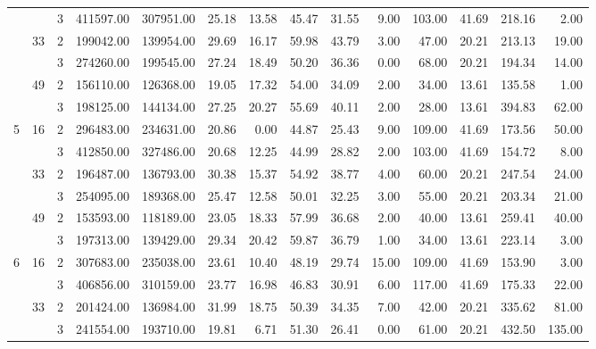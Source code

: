 \begin{tabular}{lllrrrrrrrrrrr}
  &    & 3 & 411597.00 & 307951.00 & 25.18 &   13.58 &   45.47 &   31.55 &    9.00 &  103.00 &   41.69 & 218.16 &     2.00 \\
\cline{2-14}
  & \multirow{2}{*}{33} & 2 & 199042.00 & 139954.00 & 29.69 &   16.17 &   59.98 &   43.79 &    3.00 &   47.00 &   20.21 & 213.13 &    19.00 \\
  &    & 3 & 274260.00 & 199545.00 & 27.24 &   18.49 &   50.20 &   36.36 &    0.00 &   68.00 &   20.21 & 194.34 &    14.00 \\
\cline{2-14}
  & \multirow{2}{*}{49} & 2 & 156110.00 & 126368.00 & 19.05 &   17.32 &   54.00 &   34.09 &    2.00 &   34.00 &   13.61 & 135.58 &     1.00 \\
  &    & 3 & 198125.00 & 144134.00 & 27.25 &   20.27 &   55.69 &   40.11 &    2.00 &   28.00 &   13.61 & 394.83 &    62.00 \\
\cline{1-14}
\cline{2-14}
\multirow{6}{*}{5} & \multirow{2}{*}{16} & 2 & 296483.00 & 234631.00 & 20.86 &    0.00 &   44.87 &   25.43 &    9.00 &  109.00 &   41.69 & 173.56 &    50.00 \\
  &    & 3 & 412850.00 & 327486.00 & 20.68 &   12.25 &   44.99 &   28.82 &    2.00 &  103.00 &   41.69 & 154.72 &     8.00 \\
\cline{2-14}
  & \multirow{2}{*}{33} & 2 & 196487.00 & 136793.00 & 30.38 &   15.37 &   54.92 &   38.77 &    4.00 &   60.00 &   20.21 & 247.54 &    24.00 \\
  &    & 3 & 254095.00 & 189368.00 & 25.47 &   12.58 &   50.01 &   32.25 &    3.00 &   55.00 &   20.21 & 203.34 &    21.00 \\
\cline{2-14}
  & \multirow{2}{*}{49} & 2 & 153593.00 & 118189.00 & 23.05 &   18.33 &   57.99 &   36.68 &    2.00 &   40.00 &   13.61 & 259.41 &    40.00 \\
  &    & 3 & 197313.00 & 139429.00 & 29.34 &   20.42 &   59.87 &   36.79 &    1.00 &   34.00 &   13.61 & 223.14 &     3.00 \\
\cline{1-14}
\cline{2-14}
\multirow{6}{*}{6} & \multirow{2}{*}{16} & 2 & 307683.00 & 235038.00 & 23.61 &   10.40 &   48.19 &   29.74 &   15.00 &  109.00 &   41.69 & 153.90 &     3.00 \\
  &    & 3 & 406856.00 & 310159.00 & 23.77 &   16.98 &   46.83 &   30.91 &    6.00 &  117.00 &   41.69 & 175.33 &    22.00 \\
\cline{2-14}
  & \multirow{2}{*}{33} & 2 & 201424.00 & 136984.00 & 31.99 &   18.75 &   50.39 &   34.35 &    7.00 &   42.00 &   20.21 & 335.62 &    81.00 \\
  &    & 3 & 241554.00 & 193710.00 & 19.81 &    6.71 &   51.30 &   26.41 &    0.00 &   61.00 &   20.21 & 432.50 &   135.00 \\

\end{tabular}
